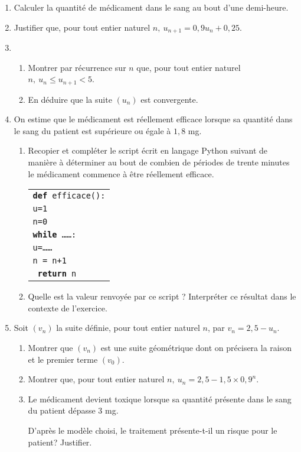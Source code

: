 \documentclass[11pt]{article}
\begin{document}
\begin{enumerate}
\item Calculer la quantité de médicament dans le sang au bout d'une demi-heure.
\item Justifier que, pour tout entier naturel $n,\: u_{n+1} = 0,9u_n + 0,25$.
\item 
	\begin{enumerate}
		\item Montrer par récurrence sur $n$ que, pour tout entier naturel $n,\: u_n \leqslant  u_{n+1} < 5$.
		\item En déduire que la suite $\left(u_n\right)$ est convergente.
	\end{enumerate}
\item On estime que le médicament est réellement efficace lorsque sa quantité dans le sang
du patient est supérieure ou égale à $1,8$ mg.
	\begin{enumerate}
		\item Recopier et compléter le script écrit en langage Python suivant de manière à déterminer au bout de combien de périodes de trente minutes le médicament commence à être réellement efficace.
\begin{center}
\begin{tabular}{|l|}\hline
\texttt{\textbf{def} efficace():}\\
\quad \texttt{u=1}\\
\quad \texttt{n=0}\\
\quad \texttt{\textbf{while} \ldots\ldots :}\\
\quad\qquad \texttt{u=\ldots\ldots}\\
\quad\qquad \texttt{n = n+1}\\
\quad \texttt{\textbf{ return }n}\\ \hline
\end{tabular}
\end{center}

		\item Quelle est la valeur renvoyée par ce script ? Interpréter ce résultat dans le contexte de l'exercice.
	\end{enumerate}		
\item Soit $\left(v_n\right)$ la suite définie, pour tout entier naturel $n$, par $v_n = 2,5 - u_n$.
	\begin{enumerate}
		\item Montrer que $\left(v_n\right)$ est une suite géométrique dont on précisera la raison et le premier terme $\left(v_0\right)$.
		\item Montrer que, pour tout entier naturel $n,\: u_n = 2,5 - 1,5 \times 0,9^n$.
		\item Le médicament devient toxique lorsque sa quantité présente dans le sang du patient dépasse $3$ mg. 
		
D'après le modèle choisi, le traitement présente-t-il un risque pour le patient? Justifier.
	\end{enumerate}
\end{enumerate}
\end{document}
